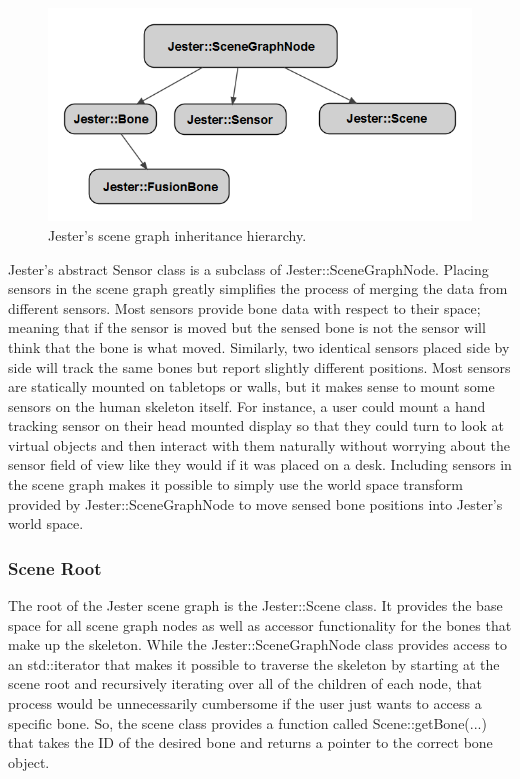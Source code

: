 \begin{figure}[]
\centering
\includegraphics[width=.75\textwidth]{figures/sceneInh}
\caption{Jester's scene graph inheritance hierarchy.}
\label{fig:scene_graph_inh}
\end{figure}

Jester's abstract Sensor class is a subclass of \mbox{Jester::SceneGraphNode}. Placing sensors in the scene graph greatly simplifies the process of merging the data from different sensors. Most sensors provide bone data with respect to their space; meaning that if the sensor is moved but the sensed bone is not the sensor will think that the bone is what moved. Similarly, two identical sensors placed side by side will track the same bones but report slightly different positions. Most sensors are statically mounted on tabletops or walls, but it makes sense to mount some sensors on the human skeleton itself. For instance, a user could mount a hand tracking sensor on their head mounted display so that they could turn to look at virtual objects and then interact with them naturally without worrying about the sensor field of view like they would if it was placed on a desk. Including sensors in the scene graph makes it possible to simply use the world space transform provided by Jester::SceneGraphNode to move sensed bone positions into Jester's world space. 

\subsubsection{Scene Root}\label{sec:scene_impl}

The root of the Jester scene graph is the \mbox{Jester::Scene} class. It provides the base space for all scene graph nodes as well as accessor functionality for the bones that make up the skeleton. While the \mbox{Jester::SceneGraphNode} class provides access to an \mbox{std::iterator} that makes it possible to traverse the skeleton by starting at the scene root and recursively iterating over all of the children of each node, that process would be unnecessarily cumbersome if the user just wants to access a specific bone. So, the scene class provides a function called \mbox{Scene::getBone(...)} that takes the ID of the desired bone and returns a pointer to the correct bone object.

